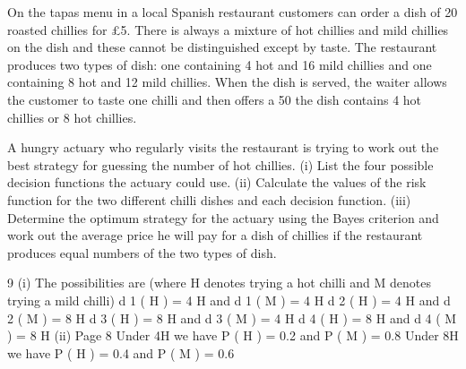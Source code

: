 \documentclass[a4paper,12pt]{article}
\begin{document}
 



On the tapas menu in a local Spanish restaurant customers can order a dish of 20 roasted chillies for £5. There is always a mixture of hot chillies and mild chillies on
the dish and these cannot be distinguished except by taste. The restaurant produces two types of dish: one containing 4 hot and 16 mild chillies and one containing 8 hot
and 12 mild chillies. When the dish is served, the waiter allows the customer to taste one chilli and then offers a 50%
the dish contains 4 hot chillies or 8 hot chillies.

A hungry actuary who regularly visits the restaurant is trying to work out the best
strategy for guessing the number of hot chillies.
(i) List the four possible decision functions the actuary could use.
(ii) Calculate the values of the risk function for the two different chilli dishes and each decision function.
(iii) Determine the optimum strategy for the actuary using the Bayes criterion and work out the average price he will pay for a dish of chillies if the restaurant
produces equal numbers of the two types of dish.

\newpage

9
(i)
The possibilities are (where H denotes trying a hot chilli and M denotes trying
a mild chilli)
d 1 ( H ) = 4 H and d 1 ( M ) = 4 H
d 2 ( H ) = 4 H and d 2 ( M ) = 8 H
d 3 ( H ) = 8 H and d 3 ( M ) = 4 H
d 4 ( H ) = 8 H and d 4 ( M ) = 8 H
(ii)
Page 8
Under 4H we have P ( H ) = 0.2 and P ( M ) = 0.8
Under 8H we have P ( H ) = 0.4 and P ( M ) = 0.6
\end{document}
